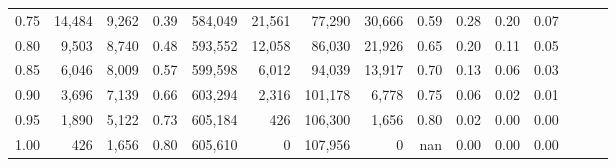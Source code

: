 \begin{tabular}{rrrrrrrrrrrrrrr}
0.75 &  14,484 &  9,262 &  0.39 &  584,049 &   21,561 &   77,290 &   30,666 &  0.59 &  0.28 &  0.20 &      0.07 \\
0.80 &   9,503 &  8,740 &  0.48 &  593,552 &   12,058 &   86,030 &   21,926 &  0.65 &  0.20 &  0.11 &      0.05 \\
0.85 &   6,046 &  8,009 &  0.57 &  599,598 &    6,012 &   94,039 &   13,917 &  0.70 &  0.13 &  0.06 &      0.03 \\
0.90 &   3,696 &  7,139 &  0.66 &  603,294 &    2,316 &  101,178 &    6,778 &  0.75 &  0.06 &  0.02 &      0.01 \\
0.95 &   1,890 &  5,122 &  0.73 &  605,184 &      426 &  106,300 &    1,656 &  0.80 &  0.02 &  0.00 &      0.00 \\
1.00 &     426 &  1,656 &  0.80 &  605,610 &        0 &  107,956 &        0 &   nan &  0.00 &  0.00 &      0.00 \\
\bottomrule
\end{tabular}
